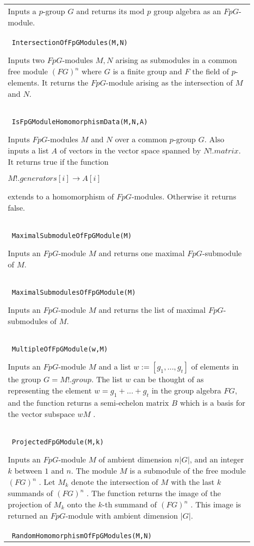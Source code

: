 \documentclass[a4paper,11pt]{report}
\begin{document}
{\begin{center}
\begin{tabular}{|l|}
 Inputs a $p$-group $G$ and returns its mod $p$ group algebra as an $FpG$-module. \\
 \index{IntersectionOfFpGModules} \texttt{ IntersectionOfFpGModules(M,N) } 

 Inputs two $FpG$-modules $M, N$ arising as submodules in a common free module $(FG)^n$ where $G$ is a finite group and $F$ the field of $p$-elements. It returns the $FpG$-module arising as the intersection of $M$ and $N$. \\
 \index{IsFpGModuleHomomorphismData} \texttt{ IsFpGModuleHomomorphismData(M,N,A) } 

 Inputs $FpG$-modules $M$ and $N$ over a common $p$-group $G$. Also inputs a list $A$ of vectors in the vector space spanned by $N!.matrix$. It returns true if the function 

 $ M!.generators[i] \longrightarrow A[i]$ 

 extends to a homomorphism of $FpG$-modules. Otherwise it returns false. \\
 \index{MaximalSubmoduleOfFpGModule} \texttt{ MaximalSubmoduleOfFpGModule(M) } 

 Inputs an $FpG$-module $M$ and returns one maximal $FpG$-submodule of $M$. \\
 \index{MaximalSubmodulesOfFpGModule} \texttt{ MaximalSubmodulesOfFpGModule(M) } 

 Inputs an $FpG$-module $M$ and returns the list of maximal $FpG$-submodules of $M$. \\
 \index{MultipleOfFpGModule} \texttt{ MultipleOfFpGModule(w,M) } 

 Inputs an $FpG$-module $M$ and a list $w:=[g_1 , ..., g_t]$ of elements in the group $G=M!.group$. The list $w$ can be thought of as representing the element $w=g_1 + \ldots + g_t$ in the group algebra $FG$, and the function returns a semi-echelon matrix $B$ which is a basis for the vector subspace $wM$ . \\
 \index{ProjectedFpGModule} \texttt{ ProjectedFpGModule(M,k) } 

 Inputs an $FpG$-module $M$ of ambient dimension $n|G|$, and an integer $k$ between $1$ and $n$. The module $M$ is a submodule of the free module $(FG)^n$ . Let $M_k$ denote the intersection of $M$ with the last $k$ summands of $(FG)^n$ . The function returns the image of the projection of $M_k$ onto the $k$-th summand of $(FG)^n$ . This image is returned an $FpG$-module with ambient dimension $|G|$. \\
 \index{RandomHomomorphismOfFpGModules} \texttt{ RandomHomomorphismOfFpGModules(M,N) } 


\end{tabular}
\end{center}}
\end{document}

